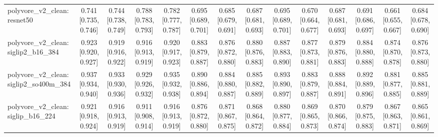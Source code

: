 \begin{table}[t]
\begin{tabular}{lccccccccccccc}
polyvore\_v2\_clean: resnet50 & 0.741 [0.735, 0.746] & 0.744 [0.738, 0.749] & 0.788 [0.783, 0.793] & 0.782 [0.777, 0.787] & 0.695 [0.689, 0.701] & 0.685 [0.679, 0.691] & 0.687 [0.681, 0.693] & 0.695 [0.689, 0.701] & 0.670 [0.664, 0.677] & 0.687 [0.681, 0.693] & 0.691 [0.686, 0.697] & 0.661 [0.655, 0.667] & 0.684 [0.678, 0.690] \\
polyvore\_v2\_clean: siglip2\_b16\_384 & 0.923 [0.920, 0.927] & 0.919 [0.916, 0.922] & 0.916 [0.913, 0.919] & 0.920 [0.917, 0.923] & 0.883 [0.879, 0.887] & 0.876 [0.872, 0.880] & 0.880 [0.876, 0.883] & 0.887 [0.883, 0.890] & 0.877 [0.873, 0.881] & 0.879 [0.876, 0.883] & 0.884 [0.880, 0.888] & 0.874 [0.870, 0.878] & 0.876 [0.873, 0.880] \\
polyvore\_v2\_clean: siglip2\_so400m\_384 & 0.937 [0.934, 0.940] & 0.933 [0.930, 0.936] & 0.929 [0.926, 0.932] & 0.935 [0.932, 0.938] & 0.890 [0.886, 0.894] & 0.884 [0.880, 0.887] & 0.885 [0.882, 0.889] & 0.893 [0.890, 0.897] & 0.883 [0.879, 0.887] & 0.888 [0.884, 0.891] & 0.892 [0.889, 0.896] & 0.881 [0.877, 0.885] & 0.885 [0.881, 0.889] \\
polyvore\_v2\_clean: siglip\_b16\_224 & 0.921 [0.918, 0.924] & 0.916 [0.913, 0.919] & 0.911 [0.908, 0.914] & 0.916 [0.913, 0.919] & 0.876 [0.872, 0.880] & 0.871 [0.867, 0.875] & 0.868 [0.864, 0.872] & 0.880 [0.877, 0.884] & 0.869 [0.865, 0.873] & 0.870 [0.866, 0.874] & 0.879 [0.875, 0.883] & 0.867 [0.863, 0.871] & 0.865 [0.861, 0.869] \\
\bottomrule\end{tabular}
\end{table}
